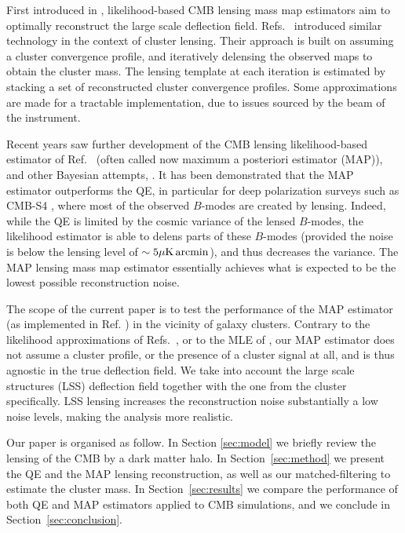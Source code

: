 \documentclass[prd, superscriptaddress, tightenlines, longbibliography, nofootinbib, eqsecnum, amsfonts, amsmath, floatfix, twocolumn, notitlepage]{revtex4-2}
\begin{document}
First introduced in \cite{Hirata:2002jy, Hirata:2003ka}, likelihood-based CMB lensing mass map estimators aim to optimally reconstruct the large scale deflection field.
Refs.~\cite{ Yoo:2008bf, Yoo:2010jd} introduced similar technology in the context of cluster lensing.
Their approach is built on assuming a cluster convergence profile, and iteratively delensing the observed maps to obtain the cluster mass. The lensing template at each iteration is estimated by stacking a set of reconstructed cluster convergence profiles. Some approximations are made for a tractable implementation, due to issues sourced by the beam of the instrument.

Recent years saw further development of the CMB lensing likelihood-based estimator of Ref.~\cite{Hirata:2002jy, Hirata:2003ka} (often called now maximum a posteriori estimator (MAP)), and other Bayesian attempts, \cite{Carron:2017mqf,Millea:2017fyd,Millea:2020cpw, Millea:2021had,Legrand:2021qdu,Aurlien:2022tlp,Legrand:2023jne,Reinecke:2023gtp}.
It has been demonstrated that the MAP estimator outperforms the QE, in particular for deep polarization surveys such as CMB-S4 \cite{CMB-S4:2016ple}, where most of the observed $B$-modes are created by lensing. Indeed, while the QE is limited by the cosmic variance of the lensed $B$-modes, the likelihood estimator is able to delens parts of these $B$-modes (provided the noise is below the lensing level of $\sim 5\mu\rm K \, arcmin$), and thus decreases the variance. The MAP lensing mass map estimator essentially achieves what is expected to be the lowest possible reconstruction noise.

The scope of the current paper is to test the performance of the MAP estimator (as implemented in Ref. \cite{Carron:2017mqf}) in the vicinity of galaxy clusters.
Contrary to the likelihood approximations of Refs.~\cite{ Yoo:2008bf, Yoo:2010jd}, or to the MLE of \cite{Lewis:2005fq, Baxter:2014frs, Raghunathan:2017cle}, our MAP estimator does not assume a cluster profile, or the presence of a cluster signal at all, and is thus agnostic in the true deflection field. We take into account the large scale structures (LSS) deflection field together with the one from the cluster specifically. LSS lensing increases the reconstruction noise substantially a low noise levels, making the analysis more realistic.

Our paper is organised as follow. In Section \ref{sec:model} we briefly review the lensing of the CMB by a dark matter halo. In Section~\ref{sec:method} we present the QE and the MAP lensing reconstruction, as well as our matched-filtering to estimate the cluster mass. In Section~\ref{sec:results} we compare the performance of both QE and MAP estimators applied to CMB simulations, and we conclude in Section~\ref{sec:conclusion}.
\end{document}
